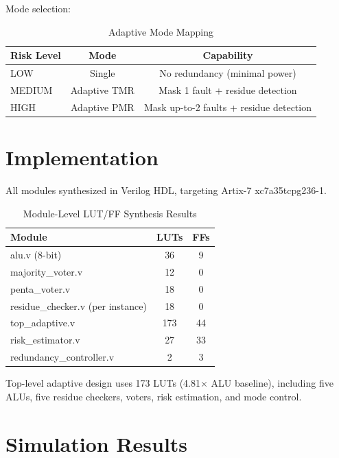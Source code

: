 \documentclass[conference]{IEEEtran}
\begin{document}
Mode selection:
\begin{table}[htbp]
\centering
\caption{Adaptive Mode Mapping}
\label{tab:modes}
\begin{tabular}{|l|c|c|}
\hline
\textbf{Risk Level} & \textbf{Mode} & \textbf{Capability} \\
\hline
LOW    & Single      & No redundancy (minimal power) \\
MEDIUM & Adaptive TMR & Mask 1 fault + residue detection \\
HIGH   & Adaptive PMR & Mask up-to-2 faults + residue detection \\
\hline
\end{tabular}
\end{table}

\section{Implementation}
\label{sec:impl}

All modules synthesized in Verilog HDL, targeting Artix-7 xc7a35tcpg236-1.

\begin{table}[htbp]
\centering
\caption{Module-Level LUT/FF Synthesis Results}
\label{tab:synth}
\begin{tabular}{|l|c|c|}
\hline
\textbf{Module} & \textbf{LUTs} & \textbf{FFs} \\
\hline
alu.v (8-bit)      & 36  & 9  \\
majority\_voter.v  & 12  & 0  \\
penta\_voter.v     & 18  & 0  \\
residue\_checker.v (per instance) & 18  & 0  \\
top\_adaptive.v    & 173 & 44 \\
risk\_estimator.v  & 27  & 33 \\
redundancy\_controller.v & 2 & 3 \\
\hline
\end{tabular}
\end{table}

Top-level adaptive design uses 173 LUTs (4.81$\times$ ALU baseline), 
including five ALUs, five residue checkers, voters, risk estimation, and mode control.

\section{Simulation Results}
\label{sec:sim}
\end{document}
